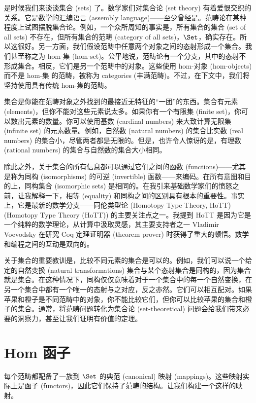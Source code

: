 
\lettrine[lhang=0.17]{是}{时候}我们来谈谈集合 (sets) 了。数学家们对集合论 (set theory) 有着爱恨交织的关系。它是数学的汇编语言 (assembly language)——至少曾经是。范畴论在某种程度上试图摆脱集合论。例如，一个众所周知的事实是，所有集合的集合 (set of all sets) 不存在，但所有集合的范畴 (category of all sets)，$\Set$，确实存在。所以这很好。另一方面，我们假设范畴中任意两个对象之间的态射形成一个集合。我们甚至称之为 hom-集 (hom-set)。公平地说，范畴论有一个分支，其中的态射不形成集合。相反，它们是另一个范畴中的对象。这些使用 hom-对象 (hom-objects) 而不是 hom-集 的范畴，被称为  categories (丰满范畴)。不过，在下文中，我们将坚持使用具有传统 hom-集的范畴。

集合是你能在范畴对象之外找到的最接近无特征的“一团”的东西。集合有元素 (elements)，但你不能对这些元素说太多。如果你有一个有限集 (finite set)，你可以数出元素的数量。你可以使用基数 (cardinal numbers) 来大致计算无限集 (infinite set) 的元素数量。例如，自然数 (natural numbers) 的集合比实数 (real numbers) 的集合小，尽管两者都是无限的。但是，也许令人惊讶的是，有理数 (rational numbers) 的集合与自然数的集合大小相同。

除此之外，关于集合的所有信息都可以通过它们之间的函数 (functions)——尤其是称为同构 (isomorphisms) 的可逆 (invertible) 函数——来编码。在所有意图和目的上，同构集合 (isomorphic sets) 是相同的。在我引来基础数学家们的愤怒之前，让我解释一下，相等 (equality) 和同构之间的区别具有根本的重要性。事实上，它是最新的数学分支——同伦类型论 (Homotopy Type Theory, HoTT) (Homotopy Type Theory (HoTT)) 的主要关注点之一。我提到 HoTT 是因为它是一个纯粹的数学理论，从计算中汲取灵感，其主要支持者之一 Vladimir Voevodsky 在研究 Coq 定理证明器 (theorem prover) 时获得了重大的顿悟。数学和编程之间的互动是双向的。

关于集合的重要教训是，比较不同元素的集合是可以的。例如，我们可以说一个给定的自然变换 (natural transformations) 集合与某个态射集合是同构的，因为集合就是集合。在这种情况下，同构仅仅意味着对于一个集合中的每一个自然变换，在另一个集合中都有一个唯一的态射与之对应，反之亦然。它们可以相互配对。如果苹果和橙子是不同范畴中的对象，你不能比较它们，但你可以比较苹果的集合和橙子的集合。通常，将范畴问题转化为集合论 (set-theoretical) 问题会给我们带来必要的洞察力，甚至让我们证明有价值的定理。

\section{Hom 函子}

每个范畴都配备了一族到 $\Set$ 的典范 (canonical) 映射 (mappings)。这些映射实际上是函子 (functors)，因此它们保持了范畴的结构。让我们构建一个这样的映射。

